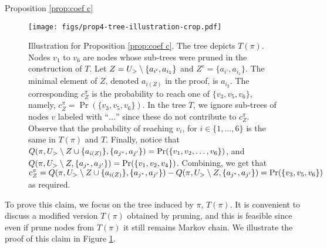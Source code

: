 \begin{proofof}{Proposition \ref{prop:coef c}}
\begin{figure}
\centering
\texttt{[image: figs/prop4-tree-illustration-crop.pdf]}
\caption{Illustration for Proposition \ref{prop:coef c}. The tree depicts $T(\pi)$. Nodes $v_1$ to $v_6$ are nodes whose sub-trees were pruned in the construction of $T$. Let $Z=U_>\setminus \{a_{i'},a_{i_1}\}$ and $Z^c= \{a_{i'},a_{i_1}\}$. The minimal element of $Z$, denoted $a_{i(Z)}$ in the proof, is $a_{i_2}$. The corresponding $c^\pi_Z$ is the probability to reach one of $\{v_3,v_5,v_6\}$, namely, $c^\pi_Z = \Pr(\{v_3,v_5,v_6\})$. In the tree $T$, we ignore sub-trees of nodes $v$ labeled with ``$\dots $'' since these do not contribute to $c^\pi_Z$. Observe that the probability of reaching $v_i$, for $i\in\{1,\dots, 6\}$ is the same in $T(\pi)$ and $T$. Finally, notice that $Q(\pi,U_>\setminus Z \cup \{a_{i(Z)}\}, \{a_{j^*},a_{j'}\})=\Pr(\{v_1,v_2,\dots,v_6 \})$, and $Q(\pi,U_>\setminus Z, \{a_{j^*},a_{j'}\})=\Pr(\{v_1,v_2,v_4\})$. Combining, we get that $c^\pi_Z = Q(\pi,U_>\setminus Z \cup \{a_{i(Z)}\}, \{a_{j^*},a_{j'}\})-Q(\pi,U_>\setminus Z, \{a_{j^*},a_{j'}\})=\Pr(\{v_3,v_5,v_6\})$ as required.
\label{fig:tree illustation}}
\end{figure}
To prove this claim, we focus on the tree induced by $\pi$, $T(\pi)$. It is convenient to discuss a modified version $T(\pi)$ obtained by pruning, and this is feasible since even if prune nodes from $T(\pi)$ it still remains Markov chain. We illustrate the proof of this claim in Figure \ref{fig:tree illustation}.


\end{proofof}
